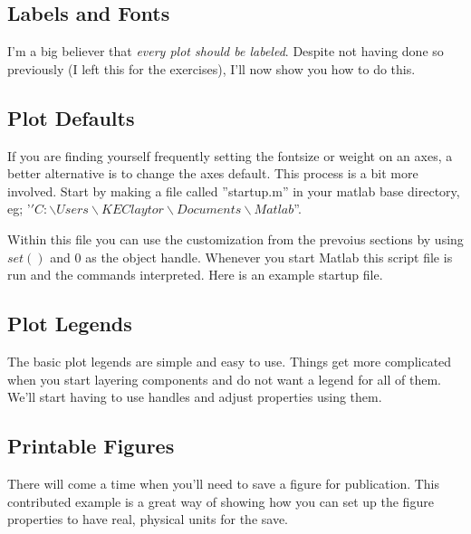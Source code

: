 \begin{quote}

\end{quote}

\pagebreak
\subsection{Labels and Fonts}
I'm a big believer that \emph{every plot should be labeled}.
 Despite not having done so previously (I left this for the exercises), I'll now show you how to do this.

\begin{quote}

\end{quote}

\pagebreak
\subsection{Plot Defaults}
If you are finding yourself frequently setting the fontsize or weight on an axes, a better alternative is to change the axes default.
 This process is a bit more involved.
 Start by making a file called ''startup.m'' in your matlab base directory, eg; '$'C:\backslash Users\backslash KEClaytor\backslash Documents\backslash Matlab$''.

Within this file you can use the customization from the prevoius sections by using $set()$ and $0$ as the object handle.
 Whenever you start Matlab this script file is run and the commands interpreted.
 Here is an example startup file.
 
\begin{quote}

\end{quote}

\pagebreak
\subsection{Plot Legends}
The basic plot legends are simple and easy to use.
 Things get more complicated when you start layering components and do not want a legend for all of them.
 We'll start having to use handles and adjust properties using them.

\begin{quote}

\end{quote}

\pagebreak
\subsection{Printable Figures}
There will come a time when you'll need to save a figure for publication.
 This contributed example is a great way of showing how you can set up the figure properties to have real, physical units for the save.

\begin{quote}

\end{quote}

